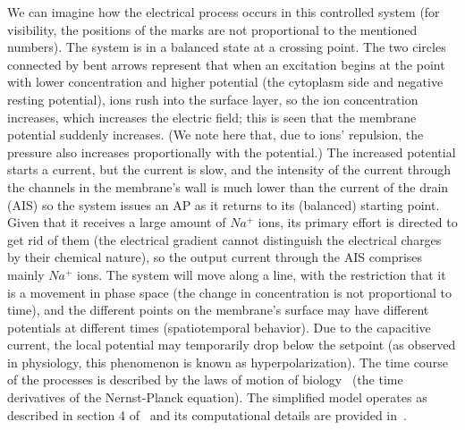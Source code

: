 We can imagine how the electrical process occurs in this 
controlled system (for visibility, the positions of the marks are not proportional to the mentioned numbers). The system is in a balanced state at a crossing point. The two circles connected by bent arrows represent that when an excitation begins at the point with lower
concentration and higher potential (the cytoplasm side and negative resting potential), ions rush into the surface layer, so the ion concentration increases, which increases the electric
field; this is seen that the membrane potential suddenly increases. (We note here that, due to ions' repulsion, the pressure also increases proportionally with the potential.)
The increased potential starts a current, but the current is slow,
and the intensity of the current through the channels in the
membrane's wall is much lower than the current of the drain (\gls{AIS})
so the system issues an \gls{AP} as it returns to its (balanced) starting point.
Given that it receives a large amount of $Na^+$ ions,
its primary effort is directed to get rid of them (the electrical gradient 
cannot distinguish the electrical charges by their chemical nature),
so the output current through the \gls{AIS} comprises mainly
$Na^+$ ions.
The system will move along a line, with the restriction that it is a movement in phase space (the change in concentration is not proportional to time), and the different points on the membrane's surface may have different potentials at different times (spatiotemporal behavior). Due to the capacitive current, the local potential may temporarily drop below the setpoint (as observed in physiology, this phenomenon is known as hyperpolarization). The time course of the processes is described by the laws of motion of biology~\cite{VeghNonOrdinaryLawsForLife:2025} (the time derivatives of the Nernst-Planck equation). The simplified model operates as described in section 4 of~\cite{VeghTechnomorphBiology:2025} and its computational details are provided  in~\cite{VeghNeuronAlgorithms:2025}.

